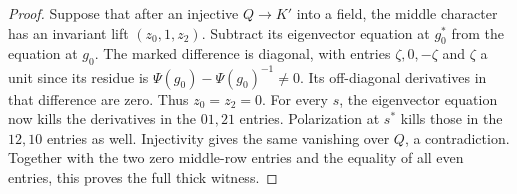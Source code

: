 \begin{proof}
Suppose that after an injective \(Q\to K'\) into a field, the middle
character has an invariant lift \((z_0,1,z_2)\). Subtract its
eigenvector equation at \(g_0^*\) from the equation at \(g_0\).
The marked difference is diagonal, with entries \(\zeta,0,-\zeta\)
and \(\zeta\) a unit since its residue is
\(\Psi(g_0)-\Psi(g_0)^{-1}\ne0\). Its off-diagonal derivatives in
that difference are zero. Thus \(z_0=z_2=0\). For every \(s\), the
eigenvector equation now kills the derivatives in the \(01,21\)
entries. Polarization at \(s^*\) kills those in the \(12,10\) entries
as well. Injectivity gives the same vanishing over \(Q\), a
contradiction. Together with the two zero middle-row entries and
the equality of all even entries, this proves the full thick witness.
\end{proof}

